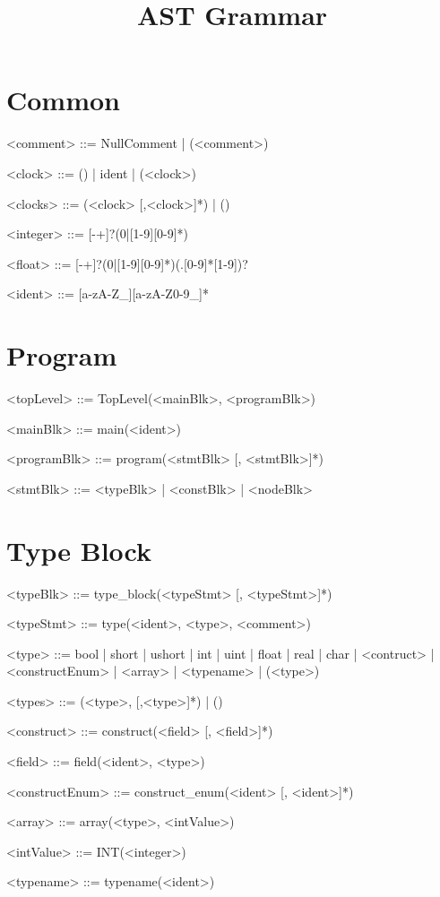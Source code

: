 \documentclass{article}
\title{\bf AST Grammar}
\begin{document}
\maketitle

\section{Common}
\begin{grammar} \small

<comment> ::= NullComment | (<comment>)

<clock> ::= () | ident | (<clock>)

<clocks> ::= (<clock> [,<clock>]*) | ()

<integer> ::= [-+]?(0|[1-9][0-9]*)

<float> ::= [-+]?(0|[1-9][0-9]*)(.[0-9]*[1-9])?

<ident> ::= [a-zA-Z_][a-zA-Z0-9_]*

\end{grammar}

\section{Program}
\begin{grammar} \small

<topLevel> ::= TopLevel(<mainBlk>, <programBlk>)

<mainBlk> ::= main(<ident>)

<programBlk> ::= program(<stmtBlk> [, <stmtBlk>]*)

<stmtBlk> ::= <typeBlk> | <constBlk> | <nodeBlk>


\end{grammar}

\section{Type Block}
\begin{grammar} \small

<typeBlk> ::= type_block(<typeStmt> [, <typeStmt>]*)

<typeStmt> ::= type(<ident>, <type>, <comment>)

<type> ::= bool | short | ushort | int | uint | float | real | char | <contruct> | <constructEnum> | <array> | <typename> | (<type>)

<types> ::= (<type>, [,<type>]*) | ()

<construct> ::= construct(<field> [, <field>]*)

<field> ::= field(<ident>, <type>)

<constructEnum> ::= construct_enum(<ident> [, <ident>]*)

<array> ::= array(<type>, <intValue>)

<intValue> ::= INT(<integer>)

<typename> ::= typename(<ident>)

\end{grammar}
\end{document}
